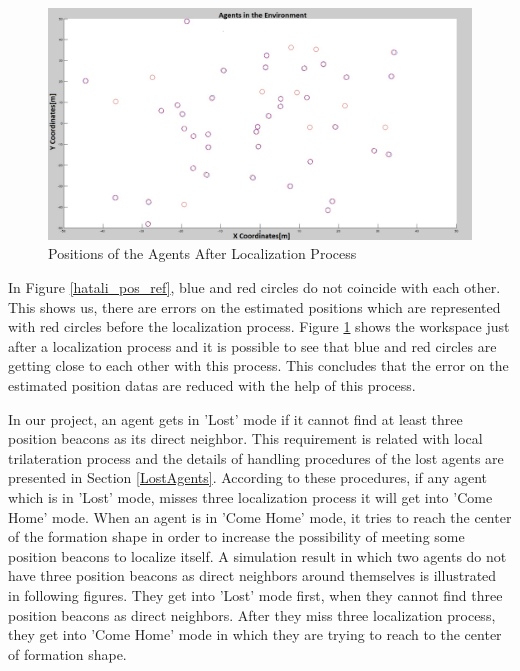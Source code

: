 \begin{figure}[H]
\centering
\captionsetup{format=hang,justification=centerfirst}
\caption{Positions of the Agents After Localization Process} \label{duzgun_pos_ref}
\centerline{\includegraphics[scale = 0.25]{Pozisyon-1-Duzeltilmis}}
\end{figure} 
In Figure \ref{hatali_pos_ref}, blue and red circles do not coincide with each other. This shows us, there are errors on the estimated positions which are represented with red circles before the localization process. Figure \ref{duzgun_pos_ref} shows the workspace just after a localization process and it is possible to see that blue and red circles are getting close to each other with this process. This concludes that the error on the estimated position datas are reduced with the help of this process.
		
In our project, an agent gets in 'Lost' mode if it cannot find at least three position beacons as its direct neighbor. This requirement is related with local trilateration process and the details of handling procedures of the lost agents are presented in Section \ref{LostAgents}. According to these procedures, if any agent which is in 'Lost' mode, misses three localization process it will get into 'Come Home' mode. When an agent is in 'Come Home' mode, it tries to reach the center of the formation shape in order to increase the possibility of meeting some position beacons to localize itself. A simulation result in which two agents do not have three position beacons as direct neighbors around themselves is illustrated in following figures. They get into 'Lost' mode first, when they cannot find three position beacons as direct neighbors. After they miss three localization process, they get into 'Come Home' mode in which they are trying to reach to the center of formation shape.
		
